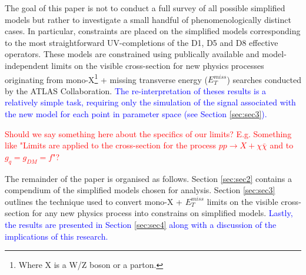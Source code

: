 \begin{flushleft}
\hspace{1cm}The goal of this paper is not to conduct a full survey of all possible simplified models but rather to investigate a small handful of phenomenologically distinct cases. In particular, constraints are placed on the simplified models corresponding to the most straightforward UV-completions of the D1, D5 and D8 effective operators. %
These models are constrained using publically available and model-independent limits on the visible cross-section for new physics processes originating from mono-X\footnote{Where X is a W/Z boson or a parton.} + missing transverse energy ($E_{T}^{miss}$) searches conducted by the ATLAS Collaboration.  \textcolor{blue}{The re-interpretation of theses results is a relatively simple task, requiring only the simulation of the signal associated with the new model for each point in parameter space (see Section \ref{sec:sec3}).}

\hspace{1cm}\textcolor{red}{Should we say something here about the specifics of our limits? E.g. Something like "Limits are applied to the cross-section for the process $pp \rightarrow X + \chi\bar{\chi}$ and to $g_{q} = g_{DM} = f$"?}

\hspace{1cm}The remainder of the paper is organised as follows. Section \ref{sec:sec2} contains a compendium of the simplified models chosen for analysis. Section \ref{sec:sec3} outlines the technique used to convert mono-X + $E_{T}^{miss}$ limits on the visible cross-section for any new physics process into constrains on simplified models. \textcolor{blue}{Lastly, the results are presented in Section \ref{sec:sec4} along with a discussion of the implications of this research.}
\end{flushleft}